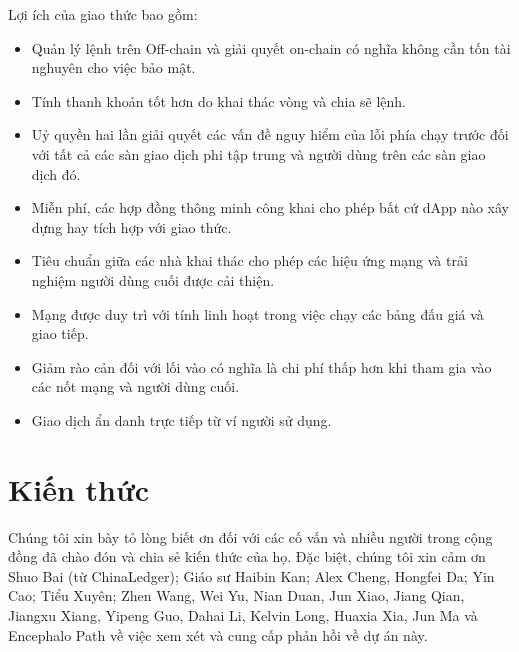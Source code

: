 \documentclass[12pt,a4paper]{article}
\begin{document}
\begin{multicols}{2}
Lợi ích của giao thức bao gồm:

\begin{itemize}
  \item Quản lý lệnh trên Off-chain  và giải quyết on-chain  có nghĩa không cần tốn tài nghuyên cho việc bảo mật.
  \item Tính thanh khoản tốt hơn do khai thác vòng và chia sẽ lệnh.
  \item Uỷ quyền hai lần giải quyết các vấn đề nguy hiểm của lỗi phía chạy trước đối với tất cả các sàn giao dịch phi tập trung và người dùng trên các sàn giao dịch đó.
  \item Miễn phí, các hợp đồng thông minh công khai cho phép bất cứ dApp nào xây dựng hay tích hợp với giao thức.
  \item Tiêu chuẩn giữa các nhà khai thác cho phép các hiệu ứng mạng và trải nghiệm người dùng cuối được cải thiện.
  \item Mạng được duy trì với tính linh hoạt trong việc chạy các bảng đấu giá và giao tiếp.
  \item Giảm rào cản đối với lối vào có nghĩa là chi phí thấp hơn khi tham gia vào các nốt mạng và người dùng cuối.
  \item Giao dịch ẩn danh trực tiếp từ ví người sử dụng.
\end{itemize}
\section{Kiến thức}
Chúng tôi xin bày tỏ lòng biết ơn đối với các cố vấn và nhiều người trong cộng đồng đã chào đón và chia sẻ kiến thức của họ. Đặc biệt, chúng tôi xin cảm ơn Shuo Bai (từ ChinaLedger); Giáo sư Haibin Kan; Alex Cheng, Hongfei Da; Yin Cao; Tiểu Xuyên; Zhen Wang, Wei Yu, Nian Duan, Jun Xiao, Jiang Qian, Jiangxu Xiang, Yipeng Guo, Dahai Li, Kelvin Long, Huaxia Xia, Jun Ma và Encephalo Path về việc xem xét và cung cấp phản hồi về dự án này.



\end{multicols}
\end{document}
